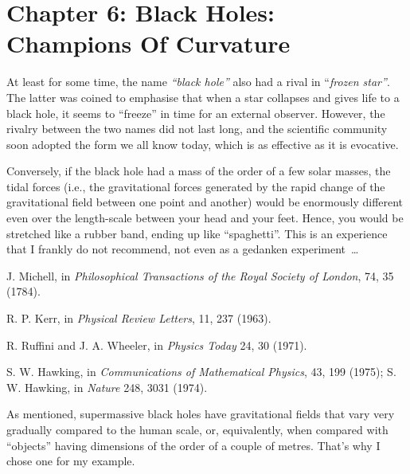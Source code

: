 \section*{Chapter 6: Black Holes: Champions Of Curvature}
\begin{description}[style=multiline,leftmargin=2em,labelwidth=1.5em]

\item[1.]\hypertarget{note:06-01}{}At least for some time, the name \emph{``black hole''} also had a rival in
``\emph{frozen star''}. The latter was coined to emphasise that when a star collapses
and gives life to a black hole, it seems to ``freeze'' in time for an external observer.
However, the rivalry between the two names did not last long, and the scientific
community soon adopted the form we all know today, which is as effective as it is
evocative.

\item[2.]\hypertarget{note:06-02}{}Conversely, if the black hole had a mass of the order of a few solar masses, the tidal
forces (i.e., the gravitational forces generated by the rapid change
of the gravitational field between one point and another) would be enormously different
even over the length-scale between your head and your feet. Hence, you would be
stretched like a rubber band, ending up like ``spaghetti''. This is an experience that I
frankly do not recommend, not even as a gedanken experiment~\ldots{}

\item[3.]\hypertarget{note:06-03}{}J. Michell, in \emph{Philosophical Transactions of the Royal Society of London}, 74, 35
(1784).

\item[4.]\hypertarget{note:06-04}{}R. P. Kerr, in \emph{Physical Review Letters}, 11, 237 (1963).

\item[5.]\hypertarget{note:06-05}{}R. Ruffini and J. A. Wheeler, in \emph{Physics Today} 24, 30 (1971).

\item[6.]\hypertarget{note:06-06}{}S. W. Hawking, in \emph{Communications of Mathematical Physics}, 43, 199 (1975); S. W.
Hawking, in \emph{Nature} 248, 3031 (1974).

\item[7.]\hypertarget{note:06-07}{}As mentioned, supermassive black holes have gravitational fields that vary very
gradually compared to the human scale, or, equivalently, when compared with ``objects''
having dimensions of the order of a couple of metres. That's why I chose one for my
example.


\end{description}
